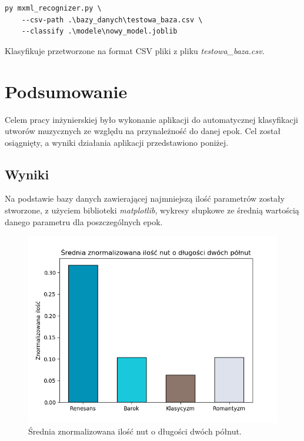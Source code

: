 \documentclass[printmode, eng]{mgr}
\newcommand\tab[1][1cm]{\hspace*{#1}}
\begin{document}
\begin{lstlisting}
py mxml_recognizer.py \
	--csv-path .\bazy_danych\testowa_baza.csv \
	--classify .\modele\nowy_model.joblib
\end{lstlisting}
Klasyfikuje przetworzone na format CSV pliki z pliku \textit{testowa\_baza.csv}. 
\chapter{Podsumowanie}
\tab Celem pracy inżynierskiej było wykonanie aplikacji do automatycznej klasyfikacji utworów muzycznych ze względu na przynależność do danej epok. Cel został osiągnięty, a wyniki działania aplikacji przedstawiono poniżej.
\section{Wyniki}
\tab Na podstawie bazy danych zawierającej najmniejszą ilość parametrów zostały stworzone, z użyciem biblioteki  \textit{matplotlib}, wykresy słupkowe ze średnią wartością danego parametru dla poszczególnych epok. 
\begin{figure}[H]
\centering
\includegraphics[scale=0.75]{plots/2fullnotes.png}
\caption{Średnia znormalizowana ilość nut o długości dwóch półnut.}
\end{figure}
\end{document}
